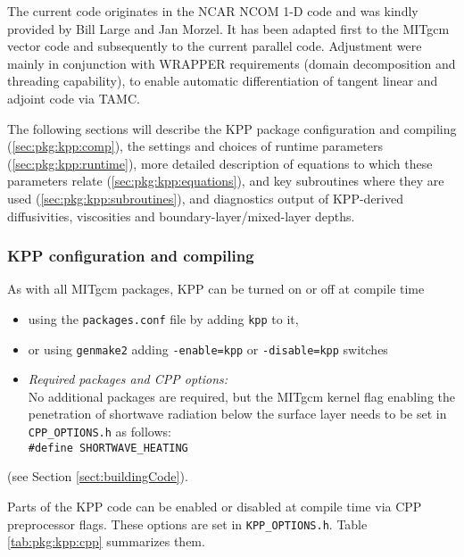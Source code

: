The current code originates in the NCAR NCOM 1-D code
and was kindly provided by Bill Large and Jan Morzel.
It has been adapted first to the MITgcm vector code and
subsequently to the current parallel code.
Adjustment were mainly in conjunction with WRAPPER requirements
(domain decomposition and threading capability), to enable
automatic differentiation of tangent linear and adjoint code
via TAMC.

The following sections will describe the KPP package
configuration and compiling (\ref{sec:pkg:kpp:comp}),
the settings and choices of runtime parameters
(\ref{sec:pkg:kpp:runtime}),
more detailed description of equations to which these
parameters relate (\ref{sec:pkg:kpp:equations}),
and key subroutines where they are used (\ref{sec:pkg:kpp:subroutines}),
and diagnostics output of KPP-derived diffusivities, viscosities
and boundary-layer/mixed-layer depths.


\subsubsection{KPP configuration and compiling
\label{sec:pkg:kpp:comp}}

As with all MITgcm packages, KPP can be turned on or off at compile time
%
\begin{itemize}
%
\item
using the \texttt{packages.conf} file by adding \texttt{kpp} to it,
%
\item
or using \texttt{genmake2} adding
\texttt{-enable=kpp} or \texttt{-disable=kpp} switches
%
\item
\textit{Required packages and CPP options:} \\
No additional packages are required, but the MITgcm kernel flag
enabling the penetration of shortwave radiation below
the surface layer needs to be set in \texttt{CPP\_OPTIONS.h} 
as follows: \\
\texttt{\#define SHORTWAVE\_HEATING}
%
\end{itemize}
(see Section \ref{sect:buildingCode}).

Parts of the KPP code can be enabled or disabled at compile time
via CPP preprocessor flags. These options are set in
\texttt{KPP\_OPTIONS.h}. Table \ref{tab:pkg:kpp:cpp} summarizes them.

